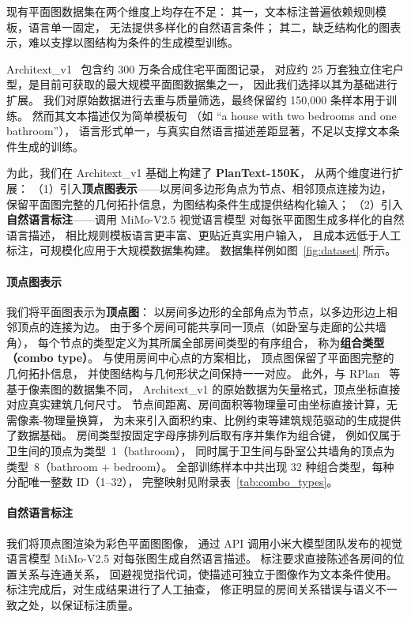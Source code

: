 现有平面图数据集在两个维度上均存在不足：
其一，文本标注普遍依赖规则模板，语言单一固定，
无法提供多样化的自然语言条件；
其二，缺乏结构化的图表示，难以支撑以图结构为条件的生成模型训练。

Architext\_v1~\cite{galanos2023architext} 包含约 300 万条合成住宅平面图记录，
对应约 25 万套独立住宅户型，是目前可获取的最大规模平面图数据集之一，
因此我们选择以其为基础进行扩展。
我们对原始数据进行去重与质量筛选，最终保留约 150,000 条样本用于训练。
然而其文本描述仅为简单模板句
（如 ``a house with two bedrooms and one bathroom''），
语言形式单一，与真实自然语言描述差距显著，不足以支撑文本条件生成的训练。

为此，我们在 Architext\_v1 基础上构建了 \textbf{PlanText-150K}，
从两个维度进行扩展：
（1）引入\textbf{顶点图表示}——以房间多边形角点为节点、相邻顶点连接为边，
保留平面图完整的几何拓扑信息，为图结构条件生成提供结构化输入；
（2）引入\textbf{自然语言标注}——调用 MiMo-V2.5 视觉语言模型
对每张平面图生成多样化的自然语言描述，
相比规则模板语言更丰富、更贴近真实用户输入，
且成本远低于人工标注，可规模化应用于大规模数据集构建。
数据集样例如图~\ref{fig:dataset} 所示。

\paragraph{顶点图表示}
我们将平面图表示为\textbf{顶点图}：
以房间多边形的全部角点为节点，以多边形边上相邻顶点的连接为边。
由于多个房间可能共享同一顶点（如卧室与走廊的公共墙角），
每个节点的类型定义为其所属全部房间类型的有序组合，
称为\textbf{组合类型（combo type）}。
与使用房间中心点的方案相比，
顶点图保留了平面图完整的几何拓扑信息，
并使图结构与几何形状之间保持一一对应。
此外，与 RPlan~\cite{wu2019data} 等基于像素图的数据集不同，
Architext\_v1 的原始数据为矢量格式，顶点坐标直接对应真实建筑几何尺寸。
节点间距离、房间面积等物理量可由坐标直接计算，无需像素-物理量换算，
为未来引入面积约束、比例约束等建筑规范驱动的生成提供了数据基础。
房间类型按固定字母序排列后取有序并集作为组合键，
例如仅属于卫生间的顶点为类型~1（bathroom），
同时属于卫生间与卧室公共墙角的顶点为类型~8（bathroom + bedroom）。
全部训练样本中共出现 32 种组合类型，每种分配唯一整数 ID（1--32），
完整映射见附录表~\ref{tab:combo_types}。

\paragraph{自然语言标注}
我们将顶点图渲染为彩色平面图图像，
通过 API 调用小米大模型团队发布的视觉语言模型 MiMo-V2.5
对每张图生成自然语言描述。
标注要求直接陈述各房间的位置关系与连通关系，
回避视觉指代词，使描述可独立于图像作为文本条件使用。
标注完成后，对生成结果进行了人工抽查，
修正明显的房间关系错误与语义不一致之处，以保证标注质量。

